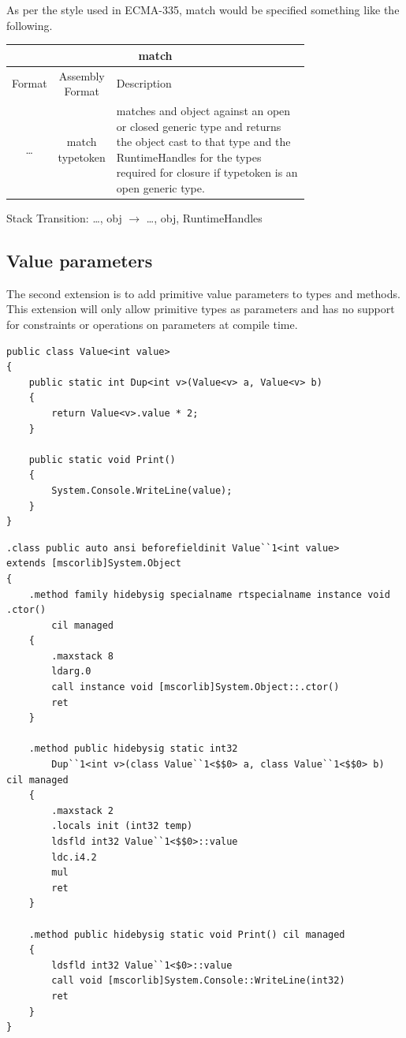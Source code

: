 \documentclass[english]{report}
\begin{document}
As per the style used in ECMA-335, match would be specified something
like the following.

\begin{tabular}{|c|c|>{\centering}p{0.75\linewidth}|}
\hline 
\multicolumn{3}{|c}{match}\tabularnewline
\hline 
\hline 
Format & Assembly Format & Description\tabularnewline
\hline 
\ldots{} & match typetoken & matches and object against an open or closed generic type and returns
the object cast to that type and the RuntimeHandles for the types
required for closure if typetoken is an open generic type.\tabularnewline
\hline 
\end{tabular}

Stack Transition: \ldots{}, obj $\rightarrow$ \ldots{}, obj, RuntimeHandles


\subsection{Value parameters}

The second extension is to add primitive value parameters to types
and methods. This extension will only allow primitive types as parameters
and has no support for constraints or operations on parameters at
compile time.

\begin{lstlisting}[caption={Value parameters in extended C\#},keywordstyle={\color{blue}},language=sharpc]
public class Value<int value>
{
	public static int Dup<int v>(Value<v> a, Value<v> b)
	{
		return Value<v>.value * 2;
	}

	public static void Print()
	{
		System.Console.WriteLine(value);
	}
}
\end{lstlisting}


\begin{lstlisting}[caption={Corresponding CIL}]
.class public auto ansi beforefieldinit Value``1<int value>
extends [mscorlib]System.Object 
{
	.method family hidebysig specialname rtspecialname instance void .ctor() 
		cil managed
	{
		.maxstack 8
		ldarg.0
		call instance void [mscorlib]System.Object::.ctor()
		ret
	}

	.method public hidebysig static int32 
		Dup``1<int v>(class Value``1<$$0> a, class Value``1<$$0> b) cil managed
	{
		.maxstack 2
		.locals init (int32 temp)
		ldsfld int32 Value``1<$$0>::value
		ldc.i4.2 
		mul
		ret
	}

	.method public hidebysig static void Print() cil managed
	{
		ldsfld int32 Value``1<$0>::value
		call void [mscorlib]System.Console::WriteLine(int32)
		ret
	}
}
\end{lstlisting}
\end{document}
